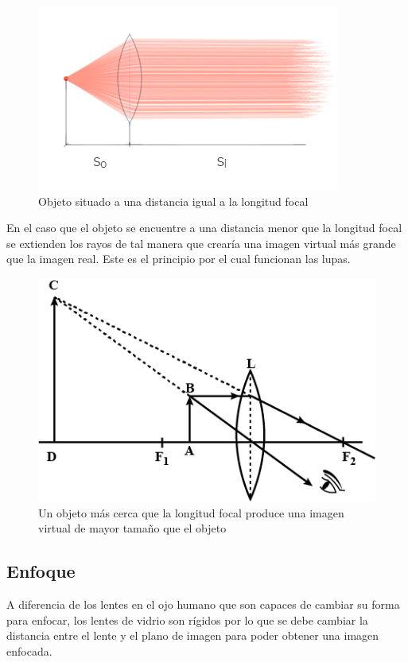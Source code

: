 \documentclass{article}
\begin{document}
\begin{figure}[H]
	\centering
	\includegraphics[width=0.65\linewidth]{Figuras/So_Si_Right}
	\caption{Objeto situado a una distancia igual a la longitud focal}
	\label{fig:sosiright}
\end{figure}

En el caso que el objeto se encuentre a una distancia menor que la longitud focal se extienden los rayos de tal manera que crearía una imagen virtual más grande que la imagen real. Este es el principio por el cual funcionan las lupas.

\begin{figure}[H]
	\centering
	\includegraphics[width=0.65\linewidth]{Figuras/Magnifying_Glass}
	\caption{Un objeto más cerca que la longitud focal produce una imagen virtual de mayor tamaño que el objeto}
	\label{fig:magnifyingglass}
\end{figure}



\subsection{Enfoque}

A diferencia de los lentes en el ojo humano que son capaces de cambiar su forma para enfocar, los lentes de vidrio son rígidos por lo que se debe cambiar la distancia entre el lente y el plano de imagen para poder obtener una imagen enfocada.
\end{document}

